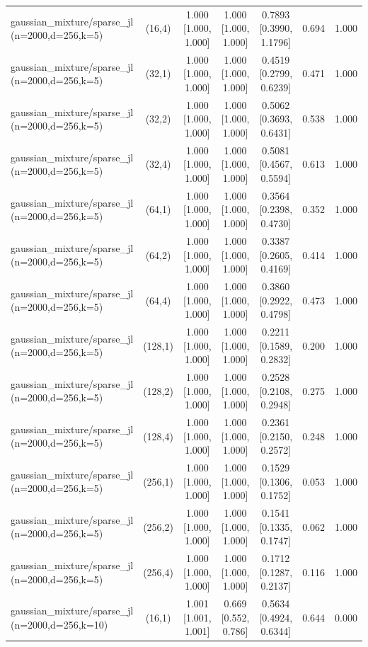 \begin{tabular}{lcccccc}
gaussian\_mixture/sparse\_jl (n=2000,d=256,k=5) & (16,4) & 1.000 [1.000, 1.000] & 1.000 [1.000, 1.000] & 0.7893 [0.3990, 1.1796] & 0.694 & 1.000 \\
gaussian\_mixture/sparse\_jl (n=2000,d=256,k=5) & (32,1) & 1.000 [1.000, 1.000] & 1.000 [1.000, 1.000] & 0.4519 [0.2799, 0.6239] & 0.471 & 1.000 \\
gaussian\_mixture/sparse\_jl (n=2000,d=256,k=5) & (32,2) & 1.000 [1.000, 1.000] & 1.000 [1.000, 1.000] & 0.5062 [0.3693, 0.6431] & 0.538 & 1.000 \\
gaussian\_mixture/sparse\_jl (n=2000,d=256,k=5) & (32,4) & 1.000 [1.000, 1.000] & 1.000 [1.000, 1.000] & 0.5081 [0.4567, 0.5594] & 0.613 & 1.000 \\
gaussian\_mixture/sparse\_jl (n=2000,d=256,k=5) & (64,1) & 1.000 [1.000, 1.000] & 1.000 [1.000, 1.000] & 0.3564 [0.2398, 0.4730] & 0.352 & 1.000 \\
gaussian\_mixture/sparse\_jl (n=2000,d=256,k=5) & (64,2) & 1.000 [1.000, 1.000] & 1.000 [1.000, 1.000] & 0.3387 [0.2605, 0.4169] & 0.414 & 1.000 \\
gaussian\_mixture/sparse\_jl (n=2000,d=256,k=5) & (64,4) & 1.000 [1.000, 1.000] & 1.000 [1.000, 1.000] & 0.3860 [0.2922, 0.4798] & 0.473 & 1.000 \\
gaussian\_mixture/sparse\_jl (n=2000,d=256,k=5) & (128,1) & 1.000 [1.000, 1.000] & 1.000 [1.000, 1.000] & 0.2211 [0.1589, 0.2832] & 0.200 & 1.000 \\
gaussian\_mixture/sparse\_jl (n=2000,d=256,k=5) & (128,2) & 1.000 [1.000, 1.000] & 1.000 [1.000, 1.000] & 0.2528 [0.2108, 0.2948] & 0.275 & 1.000 \\
gaussian\_mixture/sparse\_jl (n=2000,d=256,k=5) & (128,4) & 1.000 [1.000, 1.000] & 1.000 [1.000, 1.000] & 0.2361 [0.2150, 0.2572] & 0.248 & 1.000 \\
gaussian\_mixture/sparse\_jl (n=2000,d=256,k=5) & (256,1) & 1.000 [1.000, 1.000] & 1.000 [1.000, 1.000] & 0.1529 [0.1306, 0.1752] & 0.053 & 1.000 \\
gaussian\_mixture/sparse\_jl (n=2000,d=256,k=5) & (256,2) & 1.000 [1.000, 1.000] & 1.000 [1.000, 1.000] & 0.1541 [0.1335, 0.1747] & 0.062 & 1.000 \\
gaussian\_mixture/sparse\_jl (n=2000,d=256,k=5) & (256,4) & 1.000 [1.000, 1.000] & 1.000 [1.000, 1.000] & 0.1712 [0.1287, 0.2137] & 0.116 & 1.000 \\
gaussian\_mixture/sparse\_jl (n=2000,d=256,k=10) & (16,1) & 1.001 [1.001, 1.001] & 0.669 [0.552, 0.786] & 0.5634 [0.4924, 0.6344] & 0.644 & 0.000 \\

\end{tabular}
